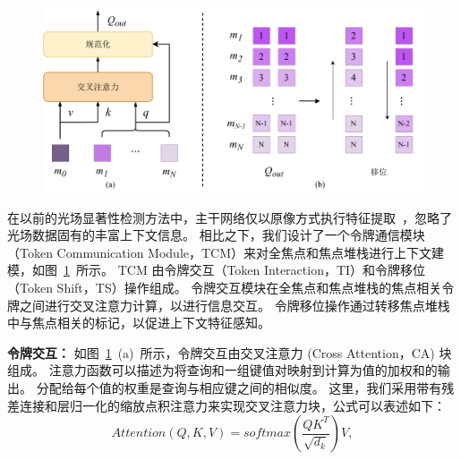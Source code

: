 %
%
%
%
%
\begin{figure}[!ht]
	\centering
	\includegraphics[width=0.95\linewidth]{figures/chapter3/token-interaction.drawio}
	\label{cpt3_fig1:token_interaction}
\end{figure}
%
%
%
%
在以前的光场显著性检测方法中，主干网络仅以原像方式执行特征提取~\cite{piao2020exploit, liu2021light}，忽略了光场数据固有的丰富上下文信息。 相比之下，我们设计了一个令牌通信模块（Token Communication Module，TCM）来对全焦点和焦点堆栈进行上下文建模，如图~\ref{cpt3_fig1:token_interaction}~所示。
TCM 由令牌交互（Token Interaction，TI）和令牌移位（Token Shift，TS）操作组成。 
令牌交互模块在全焦点和焦点堆栈的焦点相关令牌之间进行交叉注意力计算，以进行信息交互。 
令牌移位操作通过转移焦点堆栈中与焦点相关的标记，以促进上下文特征感知。 
%
%
%
%
%
\par
\textbf{令牌交互：}
如图~\ref{cpt3_fig1:token_interaction}~(a)~所示，令牌交互由交叉注意力 (Cross Attention，CA) 块组成。 
注意力函数可以描述为将查询和一组键值对映射到计算为值的加权和的输出。 
分配给每个值的权重是查询与相应键之间的相似度。 
这里，我们采用带有残差连接和层归一化的缩放点积注意力来实现交叉注意力块，公式可以表述如下：
%
%
%
\begin{equation}
	Attention(Q,K,V) = softmax \left ( \frac{QK^{T}}{\sqrt{d_{k}}} \right ) V,
\end{equation}
